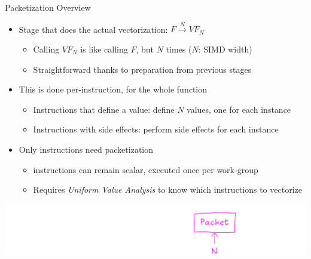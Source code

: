 
\begin{frame}{Packetization Overview}

\begin{itemize}
    \item Stage that does the actual vectorization: $ F \xrightarrow{N} VF_N$
    \begin{itemize}
        \item Calling $VF_N$ is like calling $F$, but $N$ times ($N$: SIMD width)
        \item Straightforward thanks to preparation from previous stages
    \end{itemize}
    
    \item This is done per-instruction, for the whole function
    \begin{itemize}
        \item Instructions that define a value: define $N$ values, one for each instance
        \item Instructions with side effects: perform side effects for each instance
    \end{itemize}
    
    \item Only  instructions need packetization
    \begin{itemize}
        \item {} instructions can remain scalar, executed once per work-group
        \item Requires \emph{Uniform Value Analysis} to know which instructions to vectorize
    \end{itemize}
    
\end{itemize}

\vspace{1.5ex}
\hspace{1em}\includegraphics[scale=0.55]{images/stages-packet.pdf}

\end{frame}


